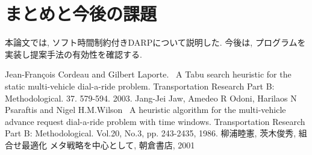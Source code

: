 \documentclass[a4j,11pt,twocolumn]{jsarticle}
\begin{document}
\section{まとめと今後の課題}
本論文では, ソフト時間制約付きDARPについて説明した. 今後は, プログラムを実装し提案手法の有効性を確認する.
\begin{thebibliography}{99}
   Jean-François Cordeau and Gilbert Laporte.  \, A Tabu search heuristic for the static multi-vehicle dial-a-ride problem. Transportation Research Part B: Methodological. 37. 579-594. 2003.
   Jang-Jei Jaw, Amedeo R Odoni, Harilaos N Psaraftis and Nigel H.M.Wilson \, A heuristic algorithm for the multi-vehicle advance request dial-a-ride problem with time windows. Transportation Research Part B: Methodological. Vol.20, No.3, pp. 243-2435, 1986.
   柳浦睦憲, 茨木俊秀, 組合せ最適化 メタ戦略を中心として, 朝倉書店, 2001
\end{thebibliography}
\end{document}
